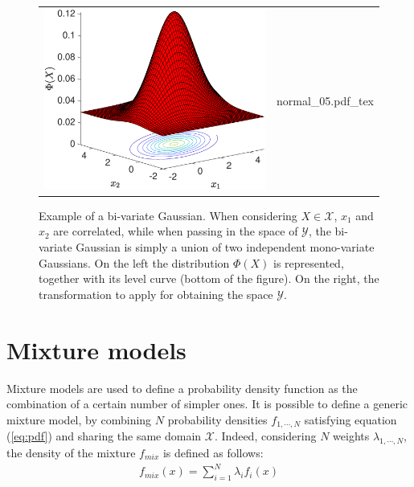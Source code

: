 \documentclass{article}
\begin{document}
\begin{figure}
	\centering
\begin{tabular}{ll}
\begin{minipage}[t]{0.55 \columnwidth}
	\includegraphics[width=0.8 \columnwidth]{./image/normal_04.eps}
\end{minipage}
 & 
\begin{minipage}[t]{0.4 \columnwidth}
\def\svgwidth{ \columnwidth}
{normal_05.pdf_tex} 
\end{minipage}
\end{tabular}
\caption{Example of a bi-variate Gaussian. When considering $X \in \mathcal{X}$, $x_1$ and $x_2$ are correlated, while when passing in the space of $\mathcal{Y}$, the bi-variate Gaussian is simply a union of two independent mono-variate Gaussians. On the left the distribution $\Phi(X)$ is represented, together with its level curve (bottom of the figure). On the right, the transformation to apply for obtaining the space $\mathcal{Y}$.}
	\label{fig:normal_change_frame}
\end{figure}

\section{Mixture models}
\label{sec:mixture}

Mixture models are used to define a probability density function as the combination of a certain number of simpler ones.
It is possible to define a generic mixture model, by combining $N$ probability densities $f_{1,\cdots,N}$ satisfying equation (\ref{eq:pdf}) and sharing the same domain $\mathcal{X}$. Indeed, considering $N$ weights $\lambda _{1,\cdots,N}$, the density of the mixture $f_{mix}$ is defined as follows:
\begin{eqnarray}
f_{mix}(x) = \sum_{i=1}^{N} \lambda_{i} f_i(x)
\label{eq:mix_pdf}
\end{eqnarray}
\end{document}
